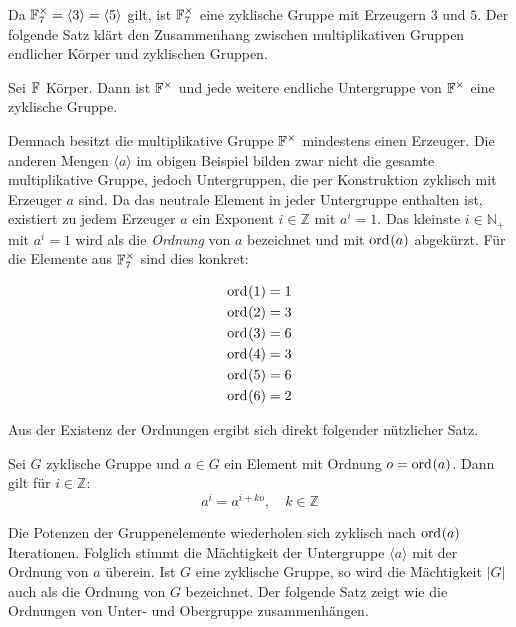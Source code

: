 Da $\field{7}^\times = \langle 3 \rangle = \langle 5 \rangle$ gilt, ist $\field{7}^\times$ eine zyklische Gruppe mit Erzeugern $3$ und $5$. Der folgende Satz klärt den Zusammenhang zwischen multiplikativen Gruppen endlicher Körper und zyklischen Gruppen.

\begin{satz}
    Sei $\field{}$ Körper. Dann ist $\field{}^\times$ und jede weitere endliche Untergruppe von $\field{}^\times$ eine zyklische Gruppe.
\end{satz}

Demnach besitzt die multiplikative Gruppe $\field{}^\times$ mindestens einen Erzeuger. Die anderen Mengen $\langle a \rangle$ im obigen Beispiel bilden zwar nicht die gesamte multiplikative Gruppe, jedoch Untergruppen, die per Konstruktion zyklisch mit Erzeuger $a$ sind. Da das neutrale Element in jeder Untergruppe enthalten ist, existiert zu jedem Erzeuger $a$ ein Exponent $i \in \mathbb{Z}$ mit $a^i = 1$. Das kleinste $i \in \mathbb{N}_+$ mit $a^i = 1$ wird als die \emph{Ordnung} von $a$ bezeichnet und mit $\ord{a}$ abgekürzt. Für die Elemente aus $\field{7}^\times$ sind dies konkret:

\begin{align*}
    \ord{1} &= 1 \\
    \ord{2} &= 3 \\
    \ord{3} &= 6 \\
    \ord{4} &= 3 \\
    \ord{5} &= 6 \\
    \ord{6} &= 2
\end{align*}

Aus der Existenz der Ordnungen ergibt sich direkt folgender nützlicher Satz.

\begin{satz} \label{satz:cyclicity}
    Sei $G$ zyklische Gruppe und $a \in G$ ein Element mit Ordnung $o = \ord{a}$. Dann gilt für $i \in \mathbb{Z}$:
    \begin{equation*}
        a^i = a^{i+ko}, \quad k \in \mathbb{Z}
    \end{equation*}
\end{satz}

Die Potenzen der Gruppenelemente wiederholen sich zyklisch nach $\ord{a}$ Iterationen. Folglich stimmt die Mächtigkeit der Untergruppe $\langle a \rangle$ mit der Ordnung von $a$ überein. Ist $G$ eine zyklische Gruppe, so wird die Mächtigkeit $|G|$ auch als die Ordnung von $G$ bezeichnet.
Der folgende Satz zeigt wie die Ordnungen von Unter- und Obergruppe zusammenhängen.

